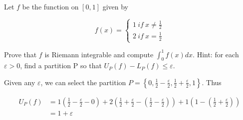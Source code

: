\documentclass[]{article}
\begin{document}
		
		






	\section{}
		\begin{em}
			Let $f$ be the function on $[0, 1]$ given by 

			\[f(x) = \begin{cases}
				1\ if\ x \neq \frac{1}{2} \\
				2\ if\ x = \frac{1}{2}
			\end{cases}\]

			Prove that $f$ is Riemann integrable and compute $\int_0^1 f(x) dx$. Hint: for each $\varepsilon > 0$, find a partition P so that $U_P(f) - L_P(f) \leq \varepsilon$. 
		\end{em}

		Given any $\varepsilon$, we can select the partition $P = \left \{0, \frac{1}{2} - \frac{\varepsilon}{2}, \frac{1}{2} + \frac{\varepsilon}{2}, 1 \right \}$. Thus

		\begin{align*}
			U_P(f) &= 1 \left (\frac{1}{2} - \frac{\varepsilon}{2} - 0 \right ) + 2\left (\frac{1}{2} + \frac{\varepsilon}{2} - \left (\frac{1}{2} - \frac{\varepsilon}{2}\right ) \right ) + 1\left (1 - \left (\frac{1}{2} + \frac{\varepsilon}{2} \right) \right ) \\
			&= 1 + \varepsilon
		\end{align*}
\end{document}
